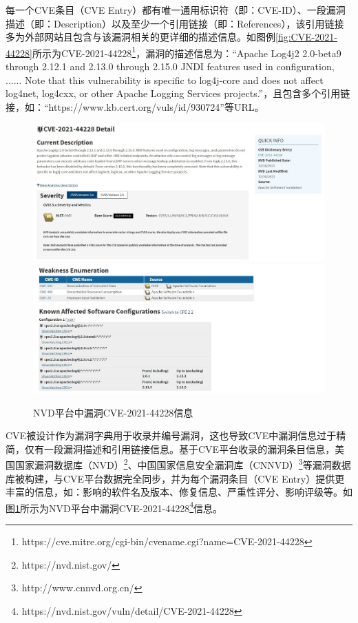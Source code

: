 每一个CVE条目（CVE Entry）都有唯一通用标识符（即：CVE-ID）、一段漏洞描述（即：Description）以及至少一个引用链接（即：References），该引用链接多为外部网站且包含与该漏洞相关的更详细的描述信息。如图例\ref{fig:CVE-2021-44228}所示为CVE-2021-44228\footnote{https://cve.mitre.org/cgi-bin/cvename.cgi?name=CVE-2021-44228}，漏洞的描述信息为：“Apache Log4j2 2.0-beta9 through 2.12.1 and 2.13.0 through 2.15.0 JNDI features used in configuration, ...... Note that this vulnerability is specific to log4j-core and does not affect log4net, log4cxx, or other Apache Logging Services projects.”，且包含多个引用链接，如：“https://www.kb.cert.org/vuls/id/930724”等URL。

\begin{figure}[h]
    \centering
    \includegraphics[width=1.0\textwidth]{fig/NVD-2021-44228}
    \includegraphics[width=1.0\textwidth]{fig/NVD-2021-44228-2}
    \caption{NVD平台中漏洞CVE-2021-44228信息}
    \label{fig:NVD-2021-44228}
\end{figure}

CVE被设计作为漏洞字典用于收录并编号漏洞，这也导致CVE中漏洞信息过于精简，仅有一段漏洞描述和引用链接信息。基于CVE平台收录的漏洞条目信息，美国国家漏洞数据库（NVD）\footnote{https://nvd.nist.gov/}、中国国家信息安全漏洞库（CNNVD）\footnote{http://www.cnnvd.org.cn/}等漏洞数据库被构建，与CVE平台数据完全同步，并为每个漏洞条目（CVE Entry）提供更丰富的信息，如：影响的软件名及版本、修复信息、严重性评分、影响评级等。如图\ref{fig:NVD-2021-44228}所示为NVD平台中漏洞CVE-2021-44228\footnote{https://nvd.nist.gov/vuln/detail/CVE-2021-44228}信息。



